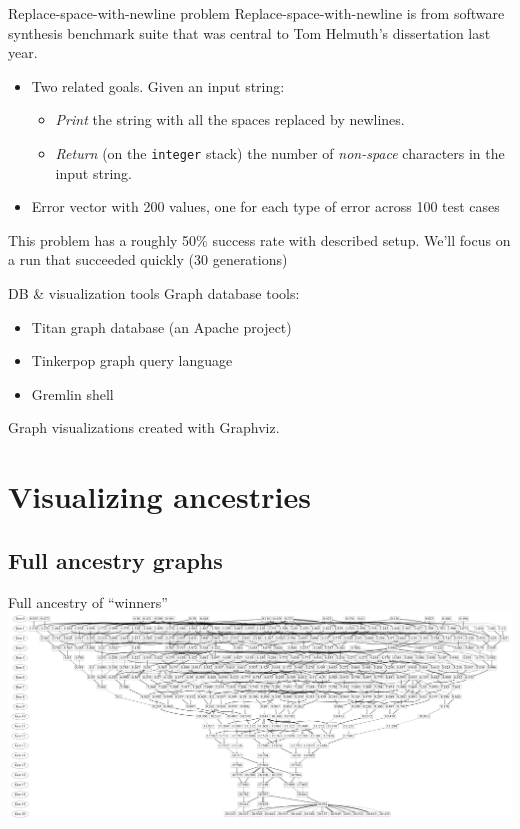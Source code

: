 \documentclass{beamer}
\newcommand{\linespace}{\vskip 0.25cm}
\begin{document}
\begin{frame}{Replace-space-with-newline problem}
	Replace-space-with-newline is from software synthesis benchmark suite that was central to Tom Helmuth's dissertation last year.
	\begin{itemize}
		\item Two related goals. Given an input string:
		\begin{itemize}
			\item \emph{Print} the string with all the spaces replaced by newlines.
			\item \emph{Return} (on the \texttt{integer} stack) the number of \emph{non-space} characters in the input string.
		\end{itemize}
		\item Error vector with 200 values, one for each type of error across 100 test cases
	\end{itemize}
	
	This problem has a roughly 50\% success rate with described setup.
	\linespace
	We'll focus on a run that succeeded quickly (30 generations)
\end{frame}

\begin{frame}{DB \& visualization tools}
	Graph database tools:
	\begin{itemize}
		\item Titan graph database (an Apache project)
		\item Tinkerpop graph query language
		\item Gremlin shell
	\end{itemize}
	\linespace
	Graph visualizations created with Graphviz.
\end{frame}

\section{Visualizing ancestries}

\subsection{Full ancestry graphs}

\begin{frame}{Full ancestry of ``winners''}
	\centering
	\includegraphics[width=\linewidth]{../../figures/run0_GPTP_2_font_40}
\end{frame}
\end{document}
